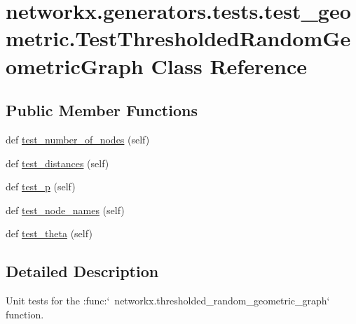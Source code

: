 \hypertarget{classnetworkx_1_1generators_1_1tests_1_1test__geometric_1_1TestThresholdedRandomGeometricGraph}{}\section{networkx.\+generators.\+tests.\+test\+\_\+geometric.\+Test\+Thresholded\+Random\+Geometric\+Graph Class Reference}
\label{classnetworkx_1_1generators_1_1tests_1_1test__geometric_1_1TestThresholdedRandomGeometricGraph}
\subsection*{Public Member Functions}
\begin{DoxyCompactItemize}
\item 
def \hyperlink{classnetworkx_1_1generators_1_1tests_1_1test__geometric_1_1TestThresholdedRandomGeometricGraph_a6917f44375db27bf421242328edd39f6}{test\+\_\+number\+\_\+of\+\_\+nodes} (self)
\item 
def \hyperlink{classnetworkx_1_1generators_1_1tests_1_1test__geometric_1_1TestThresholdedRandomGeometricGraph_a056ed154daae494c818ec09c6b17365b}{test\+\_\+distances} (self)
\item 
def \hyperlink{classnetworkx_1_1generators_1_1tests_1_1test__geometric_1_1TestThresholdedRandomGeometricGraph_a5b15e2af1303dfa737a933c4fbb3c9db}{test\+\_\+p} (self)
\item 
def \hyperlink{classnetworkx_1_1generators_1_1tests_1_1test__geometric_1_1TestThresholdedRandomGeometricGraph_ae539c3f5f19796238aa99b275dea99d0}{test\+\_\+node\+\_\+names} (self)
\item 
def \hyperlink{classnetworkx_1_1generators_1_1tests_1_1test__geometric_1_1TestThresholdedRandomGeometricGraph_a2781d0a100069c2afb394a5960a584bb}{test\+\_\+theta} (self)
\end{DoxyCompactItemize}


\subsection{Detailed Description}
\begin{DoxyVerb}Unit tests for the :func:`~networkx.thresholded_random_geometric_graph`
function.\end{DoxyVerb}
 


